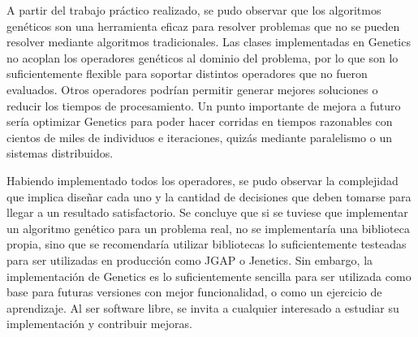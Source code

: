 \documentclass{conaiisi}
\begin{document}
\begin{multicols}{2}
{A partir del trabajo práctico realizado, se pudo observar que los algoritmos genéticos son una herramienta eficaz para resolver problemas que no se pueden resolver mediante algoritmos tradicionales.
Las clases implementadas en Genetics no acoplan los operadores genéticos al dominio del problema, por lo que son lo suficientemente flexible para soportar distintos operadores que no fueron evaluados.
Otros operadores podrían permitir generar mejores soluciones o reducir los tiempos de procesamiento.
Un punto importante de mejora a futuro sería optimizar Genetics para poder hacer corridas en tiempos razonables con cientos de miles de individuos e iteraciones, quizás mediante paralelismo o un sistemas distribuidos.

Habiendo implementado todos los operadores, se pudo observar la complejidad que implica diseñar cada uno y la cantidad de decisiones que deben tomarse para llegar a un resultado satisfactorio.
Se concluye que si se tuviese que implementar un algoritmo genético para un problema real, no se implementaría una biblioteca propia, sino que se recomendaría utilizar bibliotecas lo suficientemente testeadas para ser utilizadas en producción como JGAP\cite{jgap} o Jenetics\cite{jenetics}.
Sin embargo, la implementación de Genetics es lo suficientemente sencilla para ser utilizada como base para futuras versiones con mejor funcionalidad, o como un ejercicio de aprendizaje.
Al ser software libre, se invita a cualquier interesado a estudiar su implementación y contribuir mejoras.

}



\begin{normalsize}
\textup{
\printbibliography[heading=subbibintoc]
}
\end{normalsize}
\end{multicols}
\end{document}
